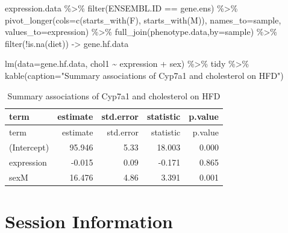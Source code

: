 \documentclass[
]{article}
\newenvironment{Shaded}{\begin{snugshade}}{\end{snugshade}}
\newcommand{\AttributeTok}[1]{\textcolor[rgb]{0.77,0.63,0.00}{#1}}
\newcommand{\FunctionTok}[1]{\textcolor[rgb]{0.00,0.00,0.00}{#1}}
\newcommand{\NormalTok}[1]{#1}
\newcommand{\OtherTok}[1]{\textcolor[rgb]{0.56,0.35,0.01}{#1}}
\newcommand{\SpecialCharTok}[1]{\textcolor[rgb]{0.00,0.00,0.00}{#1}}
\newcommand{\StringTok}[1]{\textcolor[rgb]{0.31,0.60,0.02}{#1}}
\begin{document}
\begin{Shaded}
\begin{Highlighting}[]
\NormalTok{expression.data }\SpecialCharTok{\%\textgreater{}\%}
  \FunctionTok{filter}\NormalTok{(ENSEMBL.ID }\SpecialCharTok{==}\NormalTok{ gene.ens) }\SpecialCharTok{\%\textgreater{}\%}
  \FunctionTok{pivot\_longer}\NormalTok{(}\AttributeTok{cols=}\FunctionTok{c}\NormalTok{(}\FunctionTok{starts\_with}\NormalTok{(}\StringTok{\textquotesingle{}F\textquotesingle{}}\NormalTok{),}
                      \FunctionTok{starts\_with}\NormalTok{(}\StringTok{\textquotesingle{}M\textquotesingle{}}\NormalTok{)),}
               \AttributeTok{names\_to=}\StringTok{\textquotesingle{}sample\textquotesingle{}}\NormalTok{,}
               \AttributeTok{values\_to=}\StringTok{\textquotesingle{}expression\textquotesingle{}}\NormalTok{) }\SpecialCharTok{\%\textgreater{}\%}
  \FunctionTok{full\_join}\NormalTok{(phenotype.data,}\AttributeTok{by=}\StringTok{\textquotesingle{}sample\textquotesingle{}}\NormalTok{) }\SpecialCharTok{\%\textgreater{}\%}
  \FunctionTok{filter}\NormalTok{(}\SpecialCharTok{!}\FunctionTok{is.na}\NormalTok{(diet)) }\OtherTok{{-}\textgreater{}}\NormalTok{ gene.hf.data}

\FunctionTok{lm}\NormalTok{(}\AttributeTok{data=}\NormalTok{gene.hf.data, chol1 }\SpecialCharTok{\textasciitilde{}}\NormalTok{ expression }\SpecialCharTok{+}\NormalTok{ sex) }\SpecialCharTok{\%\textgreater{}\%}
\NormalTok{  tidy }\SpecialCharTok{\%\textgreater{}\%}
  \FunctionTok{kable}\NormalTok{(}\AttributeTok{caption=}\StringTok{"Summary associations of Cyp7a1 and cholesterol on HFD"}\NormalTok{)}
\end{Highlighting}
\end{Shaded}

\begin{longtable}[]{@{}lrrrr@{}}
\caption{Summary associations of Cyp7a1 and cholesterol on
HFD}\tabularnewline
\toprule()
term & estimate & std.error & statistic & p.value \\
\midrule()
\endfirsthead
\toprule()
term & estimate & std.error & statistic & p.value \\
\midrule()
\endhead
(Intercept) & 95.946 & 5.33 & 18.003 & 0.000 \\
expression & -0.015 & 0.09 & -0.171 & 0.865 \\
sexM & 16.476 & 4.86 & 3.391 & 0.001 \\
\bottomrule()
\end{longtable}

\hypertarget{session-information}{%
\section{Session Information}\label{session-information}}
\end{document}
